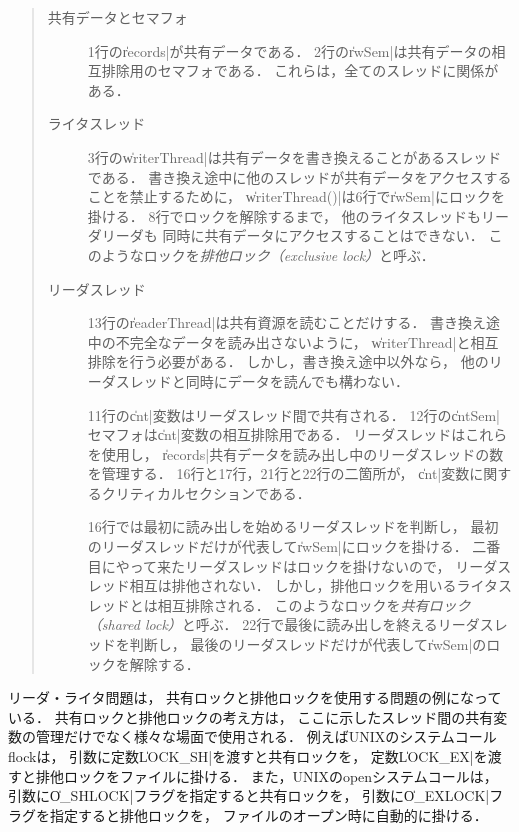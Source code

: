 \begin{quote}
  \begin{description}
  \item [共有データとセマフォ]
    1行の\|records|が共有データである．
    2行の\|rwSem|は共有データの相互排除用のセマフォである．
    これらは，全てのスレッドに関係がある．

  \item [ライタスレッド]
    3行の\|writerThread|は共有データを書き換えることがあるスレッドである．
    書き換え途中に他のスレッドが共有データをアクセスすることを禁止するために，
    \|writerThread()|は6行で\|rwSem|にロックを掛ける．
    8行でロックを解除するまで，
    他のライタスレッドもリーダリーダも
    同時に共有データにアクセスすることはできない．
    このようなロックを\emph{排他ロック（exclusive lock）}と呼ぶ．

  \item [リーダスレッド]
    13行の\|readerThread|は共有資源を読むことだけする．
    書き換え途中の不完全なデータを読み出さないように，
    \|writerThread|と相互排除を行う必要がある．
    しかし，書き換え途中以外なら，
    他のリーダスレッドと同時にデータを読んでも構わない．

    11行の\|cnt|変数はリーダスレッド間で共有される．
    12行の\|cntSem|セマフォは\|cnt|変数の相互排除用である．
    リーダスレッドはこれらを使用し，
    \|records|共有データを読み出し中のリーダスレッドの数を管理する．
    16行と17行，21行と22行の二箇所が，
    \|cnt|変数に関するクリティカルセクションである．

    16行では最初に読み出しを始めるリーダスレッドを判断し，
    最初のリーダスレッドだけが代表して\|rwSem|にロックを掛ける．
    二番目にやって来たリーダスレッドはロックを掛けないので，
    リーダスレッド相互は排他されない．
    しかし，排他ロックを用いるライタスレッドとは相互排除される．
    このようなロックを\emph{共有ロック（shared lock）}と呼ぶ．
    22行で最後に読み出しを終えるリーダスレッドを判断し，
    最後のリーダスレッドだけが代表して\|rwSem|のロックを解除する．
  \end{description}
\end{quote}

リーダ・ライタ問題は，
共有ロックと排他ロックを使用する問題の例になっている．
共有ロックと排他ロックの考え方は，
ここに示したスレッド間の共有変数の管理だけでなく様々な場面で使用される．
例えばUNIXのシステムコールflockは，
引数に定数\|LOCK_SH|を渡すと共有ロックを，
定数\|LOCK_EX|を渡すと排他ロックをファイルに掛ける．
また，UNIXのopenシステムコールは，
引数に\|O_SHLOCK|フラグを指定すると共有ロックを，
引数に\|O_EXLOCK|フラグを指定すると排他ロックを，
ファイルのオープン時に自動的に掛ける．

